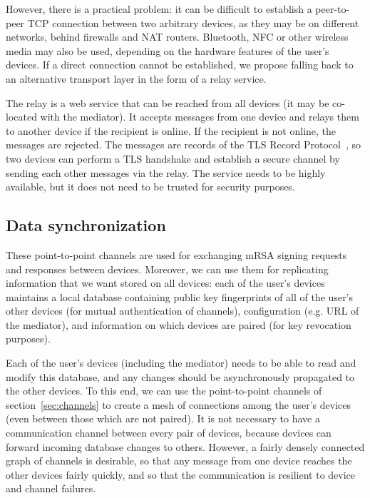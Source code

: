 However, there is a practical problem: it can be difficult to establish a peer-to-peer TCP
connection between two arbitrary devices, as they may be on different networks, behind firewalls and
NAT routers. Bluetooth, NFC or other wireless media may also be used, depending on the hardware
features of the user's devices. If a direct connection cannot be established, we propose falling
back to an alternative transport layer in the form of a relay service.

The relay is a web service that can be reached from all devices (it may be co-located with the
mediator). It accepts messages from one device and relays them to another device if the recipient is
online. If the recipient is not online, the messages are rejected. The messages are records of the
TLS Record Protocol~\cite{TLS}, so two devices can perform a TLS handshake and establish a secure
channel by sending each other messages via the relay. The service needs to be highly available, but
it does not need to be trusted for security purposes.

\subsection{Data synchronization}\label{sec:devicesync}

These point-to-point channels are used for exchanging mRSA signing requests and responses between
devices. Moreover, we can use them for replicating information that we want stored on all devices:
each of the user's devices maintains a local database containing public key fingerprints of all of
the user's other devices (for mutual authentication of channels), configuration (e.g. URL of the
mediator), and information on which devices are paired (for key revocation purposes).

Each of the user's devices (including the mediator) needs to be able to read and modify this
database, and any changes should be asynchronously propagated to the other devices. To this end, we
can use the point-to-point channels of section~\ref{sec:channels} to create a mesh of connections
among the user's devices (even between those which are not paired). It is not necessary to have a
communication channel between every pair of devices, because devices can forward incoming database
changes to others. However, a fairly densely connected graph of channels is desirable, so that any
message from one device reaches the other devices fairly quickly, and so that the communication is
resilient to device and channel failures.

